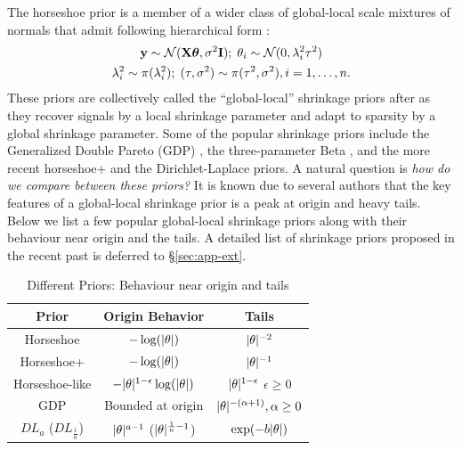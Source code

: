 \documentclass[11pt]{article}
\begin{document}
%
The horseshoe prior is a member of a wider class of global-local scale mixtures of normals that admit following hierarchical form \citep{polson2010shrink}: 
\begin{gather*}
{\bf y} \sim {\cal N}({\bf X} \boldsymbol{\theta}, \sigma^2 {\bf I}) ;\; \theta_i \sim {\cal N}(0, \lambda_i^2 \tau^2) \\
\lambda_i^2 \sim \pi(\lambda_i^2) ; \; (\tau,\sigma^2) \sim  \pi(\tau^2,\sigma^2), i = 1, \ldots, n. 
\end{gather*}
These priors are collectively called the ``global-local'' shrinkage priors after \cite{polson2010shrink} as they recover signals by a local shrinkage parameter and adapt to sparsity by a global shrinkage parameter. Some of the popular shrinkage priors include the Generalized Double Pareto (GDP) \citep{armagan2013generalized}, the three-parameter Beta \citep{armagan2011generalized}, and the more recent horseshoe+ \citep{bhadra2015horseshoe+} and the Dirichlet-Laplace \citep{bhattacharya2014dirichlet} priors. A natural question is \textit{how do we compare between these priors?} It is known due to several authors \citep[e.g.]{polson2010shrink,bhadra2015default,van2015conditions} that the key features of a global-local shrinkage prior is a peak at origin and heavy tails. Below we list a few popular global-local shrinkage priors along with their behaviour near origin and the tails. A detailed list of shrinkage priors proposed in the recent past is deferred to \S \ref{sec:app-ext}.

\begin{table}%
\centering
\begin{tabular}{| c | c |c |}
\hline
Prior & Origin Behavior & Tails \\
\hline 
Horseshoe & $-\log(\lvert\theta\rvert)$ & $\lvert\theta\rvert^{-2}$ \\
Horseshoe+ & $-\log(\lvert\theta\rvert)$ & $\lvert\theta\rvert^{-1}$ \\
Horseshoe-like & $-\lvert\theta\rvert^{1-\epsilon}\log(\lvert\theta\rvert)$ & $\lvert\theta\rvert^{1-\epsilon}$ $\epsilon \ge 0$\\
GDP & Bounded at origin & $\lvert\theta\rvert^{-(\alpha + 1)}, \alpha \ge 0$ \\
$DL_{a}$ ($DL_{\frac{1}{n}}$) & $\lvert\theta\rvert^{a-1}$ ($\lvert\theta\rvert^{\frac{1}{n}-1}$) & $\exp(-b\lvert\theta\rvert)$ \\
\hline
\end{tabular}
\caption{Different Priors: Behaviour near origin and tails}
\label{tab:priors}
\end{table}
\end{document}
